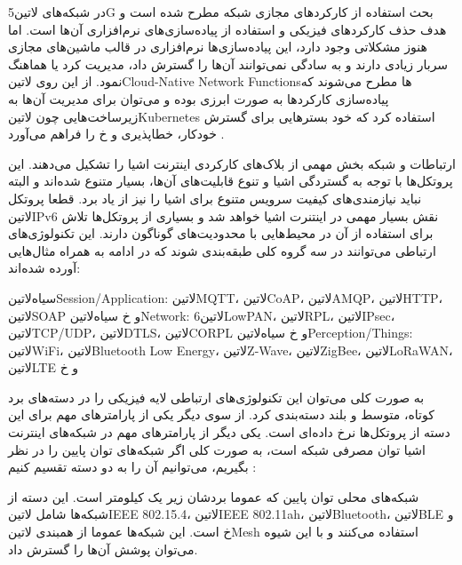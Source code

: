 در شبکه‌های ‌لاتین{5G} بحث استفاده از کارکردهای مجازی شبکه مطرح شده است و هدف حذف کارکردهای فیزیکی
و استفاده از پیاده‌سازی‌های نرم‌افزاری آن‌ها است. اما هنوز مشکلاتی وجود دارد،
این پیاده‌سازی‌ها نرم‌افزاری در قالب ماشین‌های مجازی سربار زیادی دارند
و به سادگی نمی‌توانند آن‌ها را گسترش داد، مدیریت کرد یا هماهنگ نمود.
از این روی ‌لاتین{Cloud-Native Network Functions}ها مطرح می‌شوند که پیاده‌سازی کارکردها به صورت ابرزی بوده
و می‌توان برای مدیریت آن‌ها به زیرساخت‌هایی چون ‌لاتین{Kubernetes} استفاده کرد که خود بسترهایی برای
گسترش خودکار، خطاپذیری و ‌خ را فراهم می‌آورد
.


ارتباطات و شبکه بخش مهمی از بلاک‌های کارکردی اینترنت اشیا را تشکیل می‌دهند.
این پروتکل‌ها با توجه به گستردگی اشیا و تنوع قابلیت‌های آن‌ها، بسیار متنوع شده‌اند و البته نباید نیازمندی‌های کیفیت سرویس متنوع برای اشیا را نیز از یاد برد.
قطعا پروتکل ‌لاتین{IPv6} نقش بسیار مهمی در اینتنرت اشیا خواهد شد و بسیاری از پروتکل‌ها تلاش برای استفاده از آن در محیط‌هایی با محدودیت‌های گوناگون دارند.
این تکنولوژی‌های ارتباطی می‌توانند در سه گروه کلی طبقه‌بندی شوند که در ادامه به همراه مثال‌هایی آورده شده‌اند:

 ‌سیاه{‌لاتین{Session/Application}}: ‌لاتین{MQTT}، ‌لاتین{CoAP}، ‌لاتین{AMQP}، ‌لاتین{HTTP}، ‌لاتین{SOAP} و ‌خ
 ‌سیاه{‌لاتین{Network}}: ‌لاتین{6LowPAN}، ‌لاتین{RPL}، ‌لاتین{IPsec}، ‌لاتین{TCP/UDP}، ‌لاتین{DTLS}، ‌لاتین{CORPL} و ‌خ
 ‌سیاه{‌لاتین{Perception/Things}}: ‌لاتین{WiFi}، ‌لاتین{Bluetooth Low Energy}، ‌لاتین{Z-Wave}، ‌لاتین{ZigBee}، ‌لاتین{LoRaWAN}، ‌لاتین{LTE} و ‌خ

به صورت کلی می‌توان این تکنولوژی‌های ارتباطی لایه فیزیکی را در دسته‌های برد کوتاه، متوسط و بلند دسته‌بندی کرد.
از سوی دیگر یکی از پارامترهای مهم برای این دسته از پروتکل‌ها نرخ داده‌ای است. یکی دیگر از پارامترهای مهم در شبکه‌های اینترنت اشیا توان مصرفی شبکه است، به صورت کلی اگر شبکه‌های توان پایین را
در نظر بگیریم، می‌توانیم آن را به دو دسته تقسیم کنیم :

 شبکه‌های محلی توان پایین که عموما بردشان زیر یک کیلومتر است. این دسته از شبکه‌ها شامل ‌لاتین{IEEE 802.15.4}، ‌لاتین{IEEE 802.11ah}، ‌لاتین{Bluetooth}، ‌لاتین{BLE} و ‌خ است.
این شبکه‌ها عموما از همبندی ‌لاتین{Mesh} استفاده می‌کنند و با این شیوه می‌توان پوشش آن‌ها را گسترش داد.

